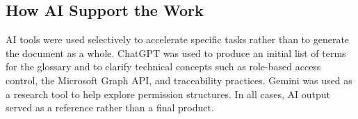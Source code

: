\subsection{How AI Support the Work}

AI tools were used selectively to accelerate specific tasks rather than to
generate the document as a whole. ChatGPT was used to produce an initial list of
terms for the glossary and to clarify technical concepts such as role-based
access control, the Microsoft Graph API, and traceability practices. Gemini was
used as a research tool to help explore permission structures. In all cases, AI
output served as a reference rather than a final product.

